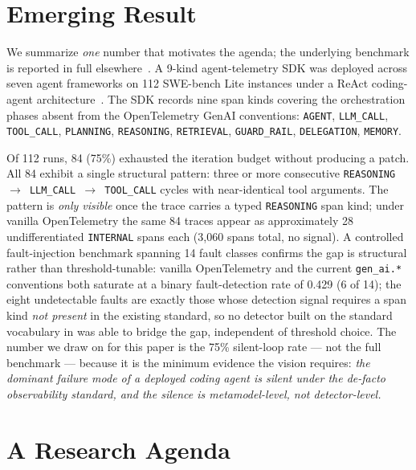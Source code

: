 \documentclass[10pt,conference]{IEEEtran}
\begin{document}
\section{Emerging Result}
\label{sec:emerging}

We summarize \emph{one} number that motivates the agenda; the
underlying benchmark is reported in full
elsewhere~\cite{anon_taxonomy_2026}. A 9-kind agent-telemetry SDK
\cite{anon_sdk_2026} was deployed across seven agent frameworks on 112
SWE-bench Lite instances under a ReAct coding-agent
architecture~\cite{react}. The SDK records nine span kinds covering
the orchestration phases absent from the OpenTelemetry GenAI
conventions: \texttt{AGENT}, \texttt{LLM\_CALL}, \texttt{TOOL\_CALL},
\texttt{PLANNING}, \texttt{REASONING}, \texttt{RETRIEVAL},
\texttt{GUARD\_RAIL}, \texttt{DELEGATION}, \texttt{MEMORY}.

Of 112 runs, 84 (75\%) exhausted the iteration budget without
producing a patch. All 84 exhibit a single structural pattern:
three or more consecutive
\texttt{REASONING $\to$ LLM\_CALL $\to$ TOOL\_CALL} cycles with
near-identical tool arguments. The pattern is \emph{only visible} once
the trace carries a typed \texttt{REASONING} span kind; under vanilla
OpenTelemetry the same 84 traces appear as approximately 28
undifferentiated \texttt{INTERNAL} spans each (3{,}060 spans total,
no signal). A controlled fault-injection benchmark spanning 14 fault
classes confirms the gap is structural rather than threshold-tunable:
vanilla OpenTelemetry and the current \texttt{gen\_ai.*} conventions
both saturate at a binary fault-detection rate of 0.429 (6 of 14);
the eight undetectable faults are exactly those whose detection
signal requires a span kind \emph{not present} in the existing
standard, so no detector built on the standard vocabulary in
\cite{anon_taxonomy_2026} was able to bridge the gap, independent
of threshold choice. The number we draw on for this paper is the
75\% silent-loop rate --- not the full benchmark --- because it is
the minimum evidence the vision requires: \emph{the dominant failure
mode of a deployed coding agent is silent under the de-facto
observability standard, and the silence is metamodel-level, not
detector-level.}

\section{A Research Agenda}
\label{sec:agenda}
\end{document}
